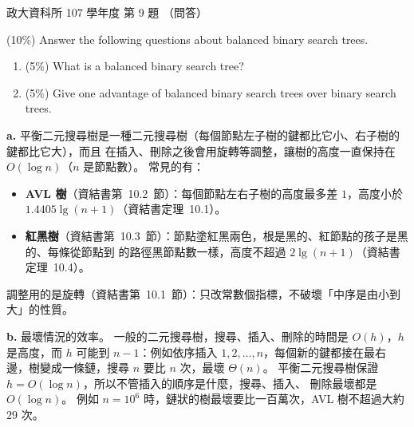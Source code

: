 \begin{pastexam}[label={px:nccu-107-dsa-09}]{政大資科所 107 學年度 第 9 題}
（問答）

(10\%) Answer the following questions about balanced binary search trees.
\begin{enumerate}[label=\alph*.]
\item (5\%) What is a balanced binary search tree?
\item (5\%) Give one advantage of balanced binary search trees over binary search trees.
\end{enumerate}
\end{pastexam}

\begin{pastsoln}
\textbf{a.} 平衡二元搜尋樹是一種二元搜尋樹（每個節點左子樹的鍵都比它小、右子樹的鍵都比它大），而且
在插入、刪除之後會用旋轉等調整，讓樹的高度一直保持在 $O(\log n)$（$n$ 是節點數）。 常見的有：
\begin{itemize}
\item \textbf{AVL 樹}（資結書第~10.2~節）：每個節點左右子樹的高度最多差 $1$，高度小於 $1.4405 \lg(n + 1)$（資結書定理~10.1）。
\item \textbf{紅黑樹}（資結書第~10.3~節）：節點塗紅黑兩色，根是黑的、紅節點的孩子是黑的、每條從節點到
\NIL 的路徑黑節點數一樣，高度不超過 $2\lg(n + 1)$（資結書定理~10.4）。
\end{itemize}
調整用的是旋轉（資結書第~10.1~節）：只改常數個指標，不破壞「中序是由小到大」的性質。

\textbf{b.} 最壞情況的效率。 一般的二元搜尋樹，搜尋、插入、刪除的時間是 $O(h)$，$h$ 是高度，而 $h$
可能到 $n - 1$：例如依序插入 $1, 2, \ldots, n$，每個新的鍵都接在最右邊，樹變成一條鏈，搜尋 $n$ 要比
$n$ 次，最壞 $\Theta(n)$。 平衡二元搜尋樹保證 $h = O(\log n)$，所以不管插入的順序是什麼，搜尋、插入、
刪除最壞都是 $O(\log n)$。 例如 $n = 10^6$ 時，鏈狀的樹最壞要比一百萬次，AVL 樹不超過大約 $29$ 次。
\end{pastsoln}
